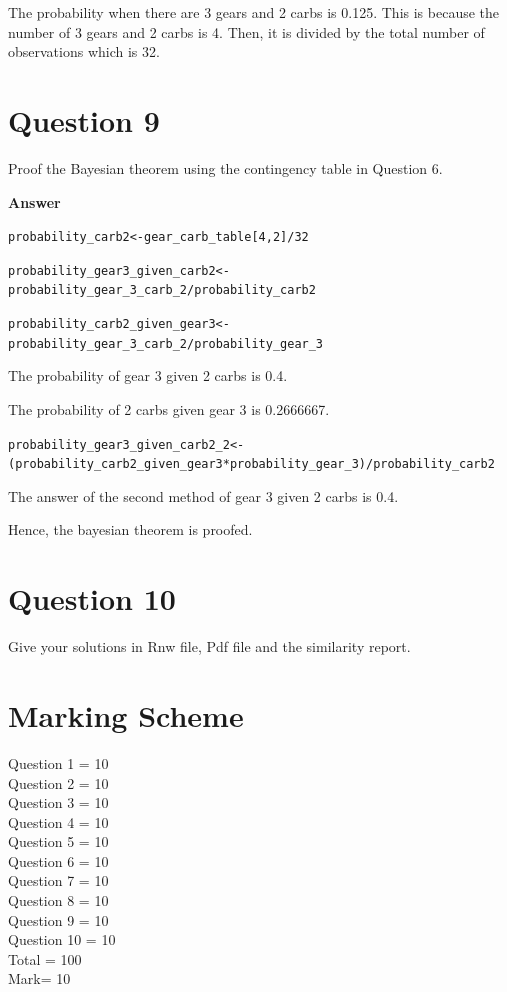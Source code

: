 \documentclass{article}\usepackage[]{graphicx}\usepackage[]{color}
\makeatletter
\newcommand{\hlnum}[1]{\textcolor[rgb]{0.686,0.059,0.569}{#1}}%
\newcommand{\hlopt}[1]{\textcolor[rgb]{0,0,0}{#1}}%
\newcommand{\hlstd}[1]{\textcolor[rgb]{0.345,0.345,0.345}{#1}}%
\newcommand{\hlkwb}[1]{\textcolor[rgb]{0.69,0.353,0.396}{#1}}%
\newenvironment{kframe}{%
 \def\at@end@of@kframe{}%
 \ifinner\ifhmode%
  \def\at@end@of@kframe{\end{minipage}}%
  \begin{minipage}{\columnwidth}%
 \fi\fi%
 \def\FrameCommand##1{\hskip\@totalleftmargin \hskip-\fboxsep
 \colorbox{shadecolor}{##1}\hskip-\fboxsep
     \hskip-\linewidth \hskip-\@totalleftmargin \hskip\columnwidth}%
 \MakeFramed {\advance\hsize-\width
   \@totalleftmargin\z@ \linewidth\hsize
   \@setminipage}}%
 {\par\unskip\endMakeFramed%
 \at@end@of@kframe}
\newenvironment{knitrout}{}{} %
\makeatother
\begin{document}
The probability when there are 3 gears and 2 carbs is 0.125. This is because the number of 3 gears and 2 carbs is 4. Then, it is divided by the total number of observations which is 32. 


\section{Question 9}
Proof the Bayesian theorem using the contingency table in Question 6.

\textbf{Answer}\\
\begin{knitrout}
\color{fgcolor}\begin{kframe}
\begin{alltt}
\hlstd{probability_carb2} \hlkwb{<-} \hlstd{gear_carb_table[}\hlnum{4}\hlstd{,}\hlnum{2}\hlstd{]} \hlopt{/} \hlnum{32}

\hlstd{probability_gear3_given_carb2} \hlkwb{<-}
  \hlstd{probability_gear_3_carb_2}\hlopt{/}\hlstd{probability_carb2}

\hlstd{probability_carb2_given_gear3} \hlkwb{<-}
  \hlstd{probability_gear_3_carb_2}\hlopt{/}\hlstd{probability_gear_3}
\end{alltt}
\end{kframe}
\end{knitrout}

The probability of gear 3 given 2 carbs is 0.4.

The probability of 2 carbs given gear 3 is 0.2666667.

\begin{knitrout}
\color{fgcolor}\begin{kframe}
\begin{alltt}
\hlstd{probability_gear3_given_carb2_2} \hlkwb{<-}
  \hlstd{(probability_carb2_given_gear3}\hlopt{*}\hlstd{probability_gear_3)}\hlopt{/}\hlstd{probability_carb2}
\end{alltt}
\end{kframe}
\end{knitrout}

The answer of the second method of gear 3 given 2 carbs is 0.4.

Hence, the bayesian theorem is proofed. 

\section{Question 10}
Give your solutions in Rnw file, Pdf file and the similarity report.

\section{Marking Scheme}


 
Question 1 = 10\\
Question 2 = 10\\
Question 3 = 10\\
Question 4 = 10\\
Question 5 = 10\\
Question 6 = 10\\
Question 7 = 10\\
Question 8 = 10\\
Question 9 = 10\\
Question 10 = 10\\
Total = 100\\
Mark= 10
\end{document}
